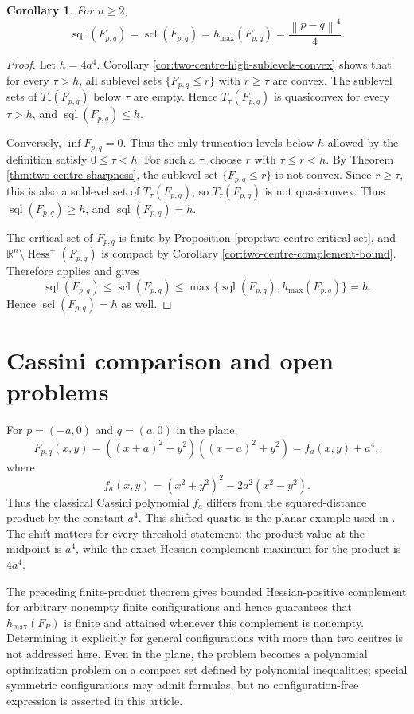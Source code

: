 \documentclass[11pt]{amsart}
\newtheorem{corollary}[theorem]{Corollary}
\theoremstyle{remark}
\newcommand{\Hessp}{\operatorname{Hess}^{+}}
\newcommand{\R}{\mathbb{R}}
\newcommand{\norm}[1]{\left\lVert #1\right\rVert}
\begin{document}
\begin{corollary}\label{cor:two-centre-truncation-levels}
For $n\ge2$,
\[
 \operatorname{sql}(F_{p,q})
 =\operatorname{scl}(F_{p,q})
 =h_{\max}(F_{p,q})
 =\frac{\norm{p-q}^4}{4}.
\]
\end{corollary}

\begin{proof}
Let $h=4a^4$. Corollary \ref{cor:two-centre-high-sublevels-convex} shows that
for every $\tau>h$, all sublevel sets $\{F_{p,q}\le r\}$ with $r\ge \tau$
are convex. The sublevel sets of $T_\tau(F_{p,q})$ below $\tau$ are empty.
Hence $T_\tau(F_{p,q})$ is quasiconvex for every $\tau>h$, and
$\operatorname{sql}(F_{p,q})\le h$.

Conversely, $\inf F_{p,q}=0$. Thus the only truncation levels below $h$ allowed
by the definition satisfy $0\le\tau<h$. For such a $\tau$, choose $r$ with
$\tau\le r<h$. By Theorem \ref{thm:two-centre-sharpness}, the sublevel set
$\{F_{p,q}\le r\}$ is not convex. Since $r\ge\tau$, this is also a sublevel set
of $T_\tau(F_{p,q})$, so $T_\tau(F_{p,q})$ is not quasiconvex. Thus
$\operatorname{sql}(F_{p,q})\ge h$, and
$\operatorname{sql}(F_{p,q})=h$.

The critical set of $F_{p,q}$ is finite by Proposition
\ref{prop:two-centre-critical-set}, and $\R^n\setminus\Hessp(F_{p,q})$ is
compact by Corollary \ref{cor:two-centre-complement-bound}. Therefore
\cite[Theorem 3.1]{Pintea2026Cqt} applies and gives
\[
 \operatorname{sql}(F_{p,q})\le \operatorname{scl}(F_{p,q})
 \le \max\{\operatorname{sql}(F_{p,q}),h_{\max}(F_{p,q})\}=h.
\]
Hence $\operatorname{scl}(F_{p,q})=h$ as well.
\end{proof}

\section{Cassini comparison and open problems}

For $p=(-a,0)$ and $q=(a,0)$ in the plane,
\[
 F_{p,q}(x,y)=((x+a)^2+y^2)((x-a)^2+y^2)=f_a(x,y)+a^4,
\]
where
\[
 f_a(x,y)=(x^2+y^2)^2-2a^2(x^2-y^2).
\]
Thus the classical Cassini polynomial $f_a$ differs from the squared-distance
product by the constant $a^4$. This shifted quartic is the planar example
used in \cite{PiTo,Pintea2026Cqt}. The shift matters for every threshold
statement: the product value at the midpoint is $a^4$, while the exact
Hessian-complement maximum for the product is $4a^4$.

The preceding finite-product theorem gives bounded Hessian-positive complement
for arbitrary nonempty finite configurations and hence guarantees that
$h_{\max}(F_P)$ is finite and attained whenever this complement is nonempty.
Determining it explicitly for general configurations with more than two centres
is not addressed here. Even in the plane, the problem becomes a polynomial
optimization problem on a compact set defined by polynomial inequalities;
special symmetric configurations may admit formulas, but no configuration-free
expression is asserted in this article.



\end{document}
